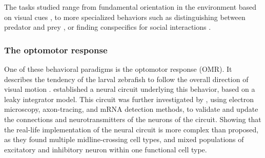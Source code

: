 \documentclass[12pt, a4paper, oneside]{article}
\begin{document}
The tasks studied range from fundamental orientation in the environment based on visual cues \parencite{bahlNeuralCircuitsEvidence2020, slangewalVisuomotorDecisionmakingMultifeature2026, boulanger-weillCorrelativeLightElectron2025}, to more specialized behaviors such as distinguishing between predator and prey \parencite{barkerSensorimotorDecisionMaking2015}, or finding conspecifics for social interactions \parencite{kappelVisualRecognitionSocial2022}.

\subsubsection{The optomotor response}
\label{sec:omr}
One of these behavioral paradigms is the optomotor response (OMR). It describes the tendency of the larval zebrafish to follow the overall direction of visual motion \parencite{orgerBehavioralScreeningAssays2004b, naumannWholeBrainDataFunctional2016}. \cite{bahlNeuralCircuitsEvidence2020} established a neural circuit underlying this behavior, based on a leaky integrator model. This circuit was further investigated by \cite{boulanger-weillCorrelativeLightElectron2025},
using electron microscopy, axon-tracing, and mRNA detection methods, to validate and update the connections and neurotransmitters of the neurons of the circuit. Showing that the real-life implementation of the neural circuit is more complex than proposed, as they found multiple midline-crossing cell types, and mixed populations of excitatory and inhibitory neuron within one functional cell type.\\
\end{document}
